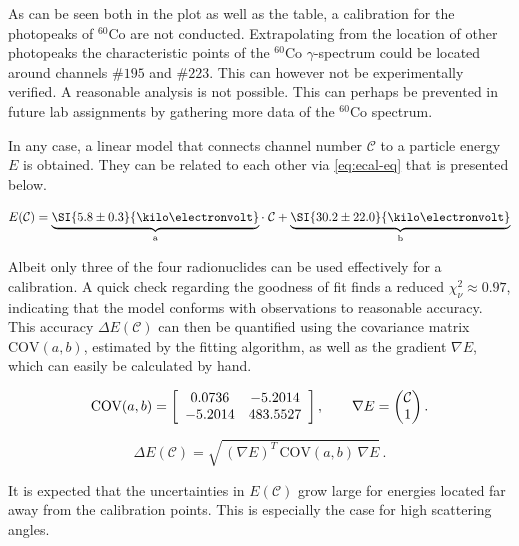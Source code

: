 

As can be seen both in the plot as well as the table, a calibration for the
photopeaks of $^{60}$Co are not conducted. Extrapolating from the location of other 
photopeaks the characteristic points of the $^{60}$Co $\gamma$-spectrum could be 
located around channels $\#195$ and $\#223$. This can however not be experimentally 
verified. A reasonable analysis is not possible. This can perhaps be prevented in
future lab assignments by gathering more data of the $^{60}$Co spectrum.

In any case, a linear model that connects channel number $\mathcal{C}$ to a particle
energy $E$ is obtained. They can be related to each other via \autoref{eq:ecal-eq}
that is presented below.

\begin{equation}
\label{eq:ecal-eq}
	E(\mathcal{C}) = \underbrace{\SI{5.8\pm0.3}{\kilo\electronvolt}}_\text{a}\cdot\;\mathcal{C} + \underbrace{\SI{30.2\pm22.0}{\kilo\electronvolt}}_\text{b}
\end{equation}

Albeit only three of the four radionuclides can be used effectively for a
calibration. A quick check regarding the
goodness of fit finds a reduced $\chi^{2}_\nu\approx0.97$, indicating that the model
conforms with observations to reasonable accuracy. This accuracy $\Delta E
(\mathcal{C})$ can then be quantified using the covariance matrix $\text{COV}(a,b)$,
estimated by the fitting algorithm, as well as the gradient $\nabla E$, which can
easily be calculated by hand.

\begin{equation*}
	\text{COV}(a,b) =
	\left[
	\begin{array}{c c}
	0.0736 & -5.2014 \\
	-5.2014 & 483.5527
	\end{array}
	\right],
	\qquad\nabla E = \begin{pmatrix}\mathcal{C}\\1\end{pmatrix}.
\end{equation*}

\begin{equation}
\label{eq:energy-error}
	\Delta E(\mathcal{C}) = \sqrt{\,(\nabla E)^{T}\,\text{COV}(a,b)\,\nabla E}\,.
\end{equation}

It is expected that the uncertainties in $E(\mathcal{C})$ grow large for energies
located far away from the calibration points. This is especially the case for high
scattering angles.
